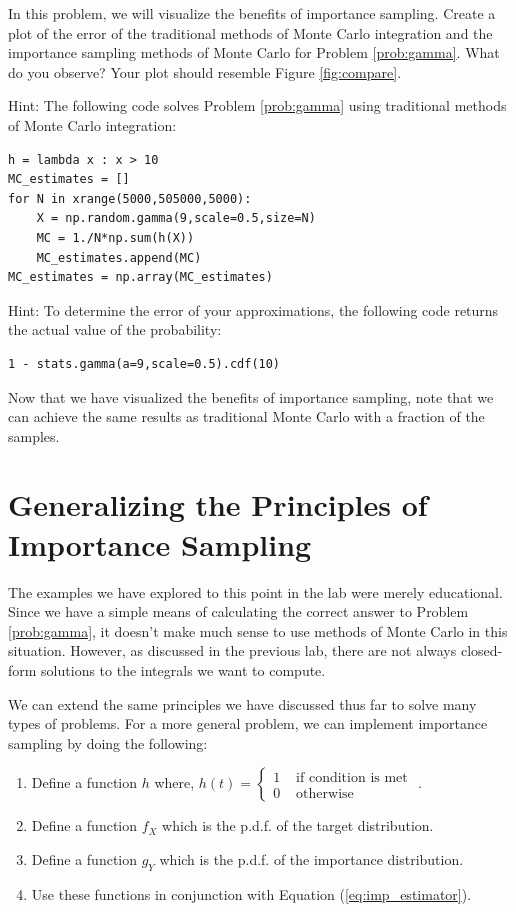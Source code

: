 \begin{problem}
In this problem, we will visualize the benefits of importance sampling. Create a plot of the error of the traditional methods of Monte Carlo integration and the importance sampling methods of Monte Carlo for Problem \ref{prob:gamma}. What do you observe? Your plot should resemble Figure \ref{fig:compare}.

Hint: The following code solves Problem \ref{prob:gamma} using traditional methods of Monte Carlo integration:
\begin{lstlisting}
h = lambda x : x > 10
MC_estimates = []
for N in xrange(5000,505000,5000):
    X = np.random.gamma(9,scale=0.5,size=N)
    MC = 1./N*np.sum(h(X))
    MC_estimates.append(MC)
MC_estimates = np.array(MC_estimates)
\end{lstlisting}

Hint: To determine the error of your approximations, the following code returns the actual value of the probability:
\begin{lstlisting}
1 - stats.gamma(a=9,scale=0.5).cdf(10)
\end{lstlisting}
\end{problem}

Now that we have visualized the benefits of importance sampling, note that we can achieve the same results as traditional Monte Carlo with a fraction of the samples.

\section*{Generalizing the Principles of Importance Sampling} %

The examples we have explored to this point in the lab were merely educational. Since we have a simple means of calculating the correct answer to Problem \ref{prob:gamma}, it doesn't make much sense to use methods of Monte Carlo in this situation. However, as discussed in the previous lab, there are not always closed-form solutions to the integrals we want to compute.

We can extend the same principles we have discussed thus far to solve many types of problems. For a more general problem, we can implement importance sampling by doing the following:
\begin{enumerate}
\item Define a function $h$ where, $h(t) = \begin{cases}
1 & \text{ if condition is met }  \\
0 & \text{ otherwise}
\end{cases} $.
\item Define a function $f_X$ which is the p.d.f. of the target distribution.
\item Define a function $g_Y$ which is the p.d.f. of the importance distribution.
\item Use these functions in conjunction with Equation (\ref{eq:imp_estimator}).
\end{enumerate}

